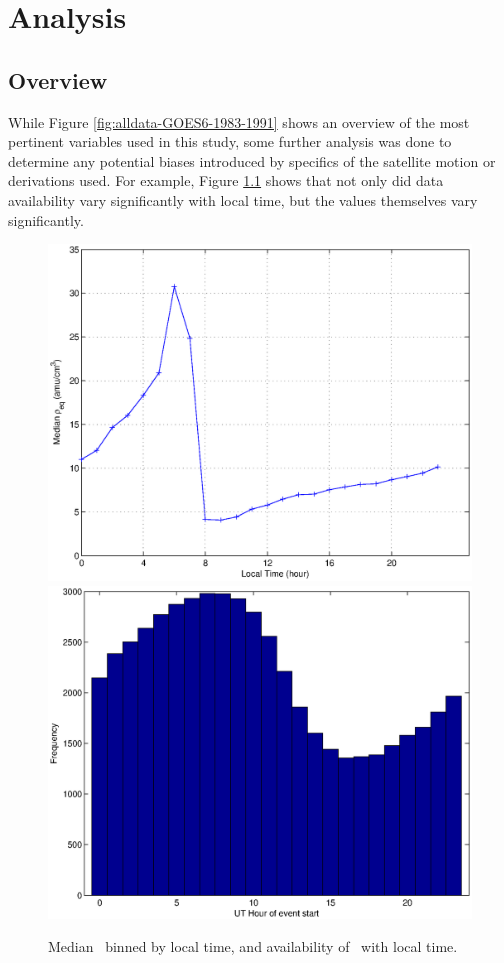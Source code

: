 \chapter[Analysis]{Analysis}

\section{Overview}
While Figure \ref{fig:alldata-GOES6-1983-1991} shows an overview of the most pertinent variables used in this study, some further analysis was done to determine any potential biases introduced by specifics of the satellite motion or derivations used. For example, Figure \ref{fig:ByHourExample} shows that not only did data availability vary significantly with local time, but the values themselves vary significantly. 

\begin{figure}
\centering
\includegraphics[width=0.7\linewidth]{Figures/rhoLT.eps}
\includegraphics[width=0.7\linewidth]{Figures/nansbyhour.eps}
\caption{Median \req\ binned by local time, and availability of \req\ with local time. }
\label{fig:ByHourExample}
\end{figure}

